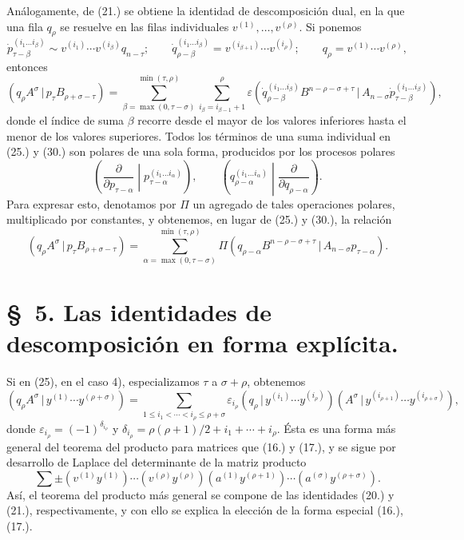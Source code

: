 \documentclass[11pt]{article}
\newcommand{\pair}[2]{(#1\,|\,#2)}
\newcommand{\eps}{\varepsilon}
\begin{document}
Análogamente, de (21.) se obtiene la identidad de descomposición dual, en la que una fila $q_\rho$ se resuelve en las filas individuales $v^{(1)},\ldots,v^{(\rho)}$. Si ponemos
\begin{equation}
 \dot p_{\tau-\beta}^{(i_1\ldots i_\beta)}\sim v^{(i_1)}\cdots v^{(i_\beta)}q_{n-\tau};\qquad
 \dot q_{\rho-\beta}^{(i_1\ldots i_\beta)}=v^{(i_{\beta+1})}\cdots v^{(i_\rho)};\qquad
 q_\rho=v^{(1)}\cdots v^{(\rho)},
\tag{29}
\end{equation}
entonces
\begin{equation}
 \pair{q_\rho A^\sigma}{p_\tau B_{\rho+\sigma-\tau}}
 =\sum_{\beta=\max(0,\tau-\sigma)}^{\min(\tau,\rho)}
   \sum_{i_\beta=i_{\beta-1}+1}^{\rho}\eps
\pair{\dot q_{\rho-\beta}^{(i_1\ldots i_\beta)}B^{n-\rho-\sigma+\tau}}{A_{n-\sigma}\dot p_{\tau-\beta}^{(i_1\ldots i_\beta)}} ,
\tag{30}
\end{equation}
donde el índice de suma $\beta$ recorre desde el mayor de los valores inferiores hasta el menor de los valores superiores. Todos los términos de una suma individual en (25.) y (30.) son polares de una sola forma, producidos por los procesos polares
\[
\left(\frac{\partial}{\partial p_{\tau-\alpha}}\middle|p_{\tau-\alpha}^{(i_1\ldots i_\alpha)}\right),\qquad
\left(q_{\rho-\alpha}^{(i_1\ldots i_\alpha)}\middle|\frac{\partial}{\partial q_{\rho-\alpha}}\right).
\]
Para expresar esto, denotamos por $\Pi$ un agregado de tales operaciones polares, multiplicado por constantes, y obtenemos, en lugar de (25.) y (30.), la relación
\begin{equation}
 \pair{q_\rho A^\sigma}{p_\tau B_{\rho+\sigma-\tau}}
 =\sum_{\alpha=\max(0,\tau-\sigma)}^{\min(\tau,\rho)}
 \Pi\pair{q_{\rho-\alpha}B^{n-\rho-\sigma+\tau}}{A_{n-\sigma}p_{\tau-\alpha}}.
\tag{31}
\end{equation}

\section*{\S\ 5. Las identidades de descomposición en forma explícita.}
Si en (25), en el caso 4), especializamos $\tau$ a $\sigma+\rho$, obtenemos
\begin{equation}
 \pair{q_\rho A^\sigma}{y^{(1)}\cdots y^{(\rho+\sigma)}}
 =\sum_{1\le i_1<\cdots<i_\rho\le \rho+\sigma}
 \eps_{i_\rho}\pair{q_\rho}{y^{(i_1)}\cdots y^{(i_\rho)}}
 \pair{A^\sigma}{y^{(i_{\rho+1})}\cdots y^{(i_{\rho+\sigma})}},
\tag{32}
\end{equation}
donde $\eps_{i_\rho}=(-1)^{\delta_{i_\rho}}$ y $\delta_{i_\rho}=\rho(\rho+1)/2+i_1+\cdots+i_\rho$. Ésta es una forma más general del teorema del producto para matrices que (16.) y (17.), y se sigue por desarrollo de Laplace del determinante de la matriz producto
\[
 \sum\pm(v^{(1)}y^{(1)})\cdots(v^{(\rho)}y^{(\rho)})(a^{(1)}y^{(\rho+1)})\cdots(a^{(\sigma)}y^{(\rho+\sigma)}).
\]
Así, el teorema del producto más general se compone de las identidades (20.) y (21.), respectivamente, y con ello se explica la elección de la forma especial (16.), (17.).
\end{document}
